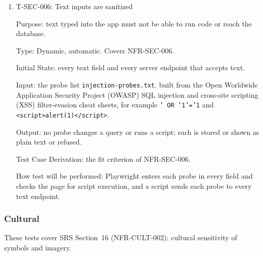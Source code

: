 \documentclass[12pt, titlepage]{article}
\newcommand{\testitem}[1]{\item #1\par\nopagebreak}
\begin{document}
\begin{enumerate}
Purpose: failed logins and timeouts are logged so problems can be found, without exposing private details in the logs.

Type: Dynamic, automatic. Covers NFR-SEC-005.

Initial State: a test adult account.

Input: ten failed logins and ten logouts by inactivity (using the
controlled clock from T-SAF-013); then a request for the audit log as
that adult.

Output: all twenty events are in the server-side log with a time stamp,
and the adult's request is refused.

Test Case Derivation: the fit criterion of NFR-SEC-005.

How test will be performed: Playwright triggers the events and the script
reads the log through the team's database console.

\testitem{T-SEC-006: Text inputs are sanitized}

Purpose: text typed into the app must not be able to run code or reach the database.

Type: Dynamic, automatic. Covers NFR-SEC-006.

Initial State: every text field and every server endpoint that accepts
text.

Input: the probe list \texttt{injection-\allowbreak{}probes.txt}, built from the Open Worldwide Application Security Project (OWASP)
SQL injection and cross-site scripting (XSS) filter-evasion cheat sheets, for example
\texttt{' OR '1'='1} and \texttt{<script>alert(1)</script>}.

Output: no probe changes a query or runs a script; each is stored or shown
as plain text or refused.

Test Case Derivation: the fit criterion of NFR-SEC-006.

How test will be performed: Playwright enters each probe in every field
and checks the page for script execution, and a script sends each probe
to every text endpoint.

\end{enumerate}

\subsubsection{Cultural}
\label{sec:cult-tests}

These tests cover SRS Section~16 (NFR-CULT-002): cultural sensitivity of symbols and imagery.
\end{document}
